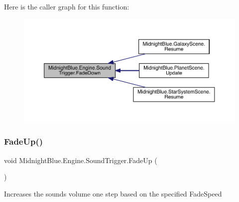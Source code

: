 Here is the caller graph for this function\+:
\nopagebreak
\begin{figure}[H]
\begin{center}
\leavevmode
\includegraphics[width=350pt]{class_midnight_blue_1_1_engine_1_1_sound_trigger_ac3df1f278adce8dac56f94cc9de8eaca_icgraph}
\end{center}
\end{figure}
\hypertarget{class_midnight_blue_1_1_engine_1_1_sound_trigger_a97b79ca1906cdb3138da1f120d4c64fd}{}\label{class_midnight_blue_1_1_engine_1_1_sound_trigger_a97b79ca1906cdb3138da1f120d4c64fd} 
\subsubsection{\texorpdfstring{Fade\+Up()}{FadeUp()}}
{\footnotesize\ttfamily void Midnight\+Blue.\+Engine.\+Sound\+Trigger.\+Fade\+Up (\begin{DoxyParamCaption}{ }\end{DoxyParamCaption})\hspace{0.3cm}{\ttfamily [inline]}}



Increases the sounds volume one step based on the specified Fade\+Speed 

